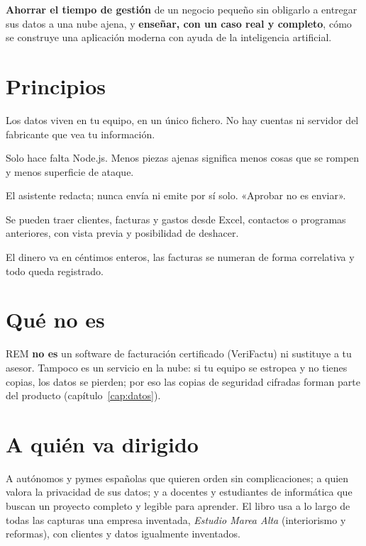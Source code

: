 \begin{ideabox}
\textbf{Ahorrar el tiempo de gestión} de un negocio pequeño sin obligarlo a entregar sus datos a una nube ajena, y \textbf{enseñar, con un caso real y completo}, cómo se construye una aplicación moderna con ayuda de la inteligencia artificial.
\end{ideabox}

\section{Principios}
\begin{description}[leftmargin=0.6cm,style=nextline]
\item[Local primero.] Los datos viven en tu equipo, en un único fichero. No hay cuentas ni servidor del fabricante que vea tu información.
\item[Sin dependencias.] Solo hace falta Node.js. Menos piezas ajenas significa menos cosas que se rompen y menos superficie de ataque.
\item[La IA propone, tú decides.] El asistente redacta; nunca envía ni emite por sí solo. «Aprobar no es enviar».
\item[Migrar sin dolor.] Se pueden traer clientes, facturas y gastos desde Excel, contactos o programas anteriores, con vista previa y posibilidad de deshacer.
\item[Explicable.] El dinero va en céntimos enteros, las facturas se numeran de forma correlativa y todo queda registrado.
\end{description}

\section{Qué no es}
\begin{warnbox}
REM \textbf{no es} un software de facturación certificado (VeriFactu) ni sustituye a tu asesor. Tampoco es un servicio en la nube: si tu equipo se estropea y no tienes copias, los datos se pierden; por eso las copias de seguridad cifradas forman parte del producto (capítulo~\ref{cap:datos}).
\end{warnbox}

\section{A quién va dirigido}
A autónomos y pymes españolas que quieren orden sin complicaciones; a quien valora la privacidad de sus datos; y a docentes y estudiantes de informática que buscan un proyecto completo y legible para aprender. El libro usa a lo largo de todas las capturas una empresa inventada, \emph{Estudio Marea Alta} (interiorismo y reformas), con clientes y datos igualmente inventados.
